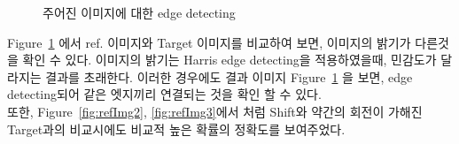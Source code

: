 \documentclass[a4paper]{article}
\begin{document}
\begin{figure}
    \centering
    \quad
    \centering
    \quad
    \centering
    \caption{주어진 이미지에 대한 edge detecting}
\label{fig:refImg}
\end{figure}

Figure~\ref{fig:refImg} 에서 ref. 이미지와 Target 이미지를 비교하여 보면, 이미지의 밝기가 다른것을 확인 수 있다. 이미지의 밝기는 Harris edge detecting을 적용하였을때, 민감도가 달라지는 결과를 초래한다. 이러한 경우에도 결과 이미지 Figure~\ref{fig:refImg} 을 보면, edge detecting되어 같은 엣지끼리 연결되는 것을 확인 할 수 있다.
\\또한, Figure~\ref{fig:refImg2}, \ref{fig:refImg3}에서 처럼 Shift와 약간의 회전이 가해진 Target과의 비교시에도 비교적 높은 확률의 정확도를 보여주었다.
\end{document}
